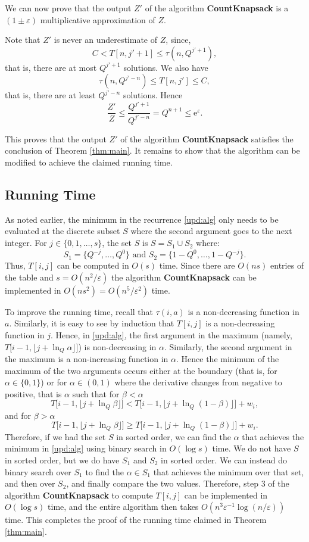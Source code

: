 \documentclass[11pt]{article}
\def\eps{\varepsilon}
\begin{document}
We can now prove that the output $Z'$ of the
algorithm {\bf CountKnapsack} is a
$(1\pm\eps)$ multiplicative
approximation of $Z$.

Note that $Z'$ is never an underestimate of $Z$, since,
\[
C < T[n,j'+1]\leq\tau(n,Q^{j'+1}),
\]
that is, there are at most $Q^{j'+1}$ solutions. We also have
\[
\tau(n,Q^{j'-n})\leq T[n,j']\leq C,
\] that is, there are at least $Q^{j'-n}$ solutions.
Hence
$$
\frac{Z'}{Z} \leq \frac{Q^{j'+1}}{Q^{j'-n}} = Q^{n+1}\leq {\mathrm e}^{\eps}.
$$

This proves that the output $Z'$ of the algorithm {\bf CountKnapsack}
satisfies the conclusion of Theorem \ref{thm:main}.
It remains to show that the algorithm can be modified to achieve the
claimed running time.

\subsection{Running Time}

As noted earlier, the minimum in the
recurrence \eqref{upd:alg} only needs to be evaluated at the discrete subset $S$
where the second argument goes to the next integer.
For $j\in \{0,1,\dots,s\}$,
the set $S$ is $S=S_1\cup S_2$ where:
\[
S_1 = \{Q^{-j},\dots,Q^{0}\} \mbox{ and }
S_2 = \{1-Q^0,\dots,1-Q^{-j}\}.
\]
Thus, $T[i,j]$ can be computed in $O(s)$ time.  Since
there are $O(ns)$ entries of the table and $s=O(n^2/\eps)$ the
algorithm {\bf CountKnapsack} can be implemented in $O(ns^2) = O(n^5/\eps^2)$ time.

To improve the running time, recall that $\tau(i,a)$ is a non-decreasing function in $a$.
Similarly, it is easy to see by induction that $T[i,j]$ is a non-decreasing
function in $j$.  Hence, in \eqref{upd:alg}, the first argument in the
maximum (namely, $T\big[i-1,\lfloor j + \ln_{Q}\alpha\rfloor\big]$)
is non-decreasing in $\alpha$.
Similarly, the second argument in the maximum is a non-increasing function in $\alpha$.
Hence
the minimum of the maximum of the two arguments occurs either at
the boundary (that is, for $\alpha\in\{0,1\}$) or for $\alpha\in
(0,1)$ where the derivative changes from negative to positive,
that is $\alpha$ such that for $\beta<\alpha$
$$T\big[i-1,\lfloor j + \ln_{Q}\beta\rfloor\big] < T\big[i-1,\lfloor j + \ln_{Q}(1-\beta)\rfloor\big] + w_i,$$
and for $\beta>\alpha$
$$T\big[i-1,\lfloor j + \ln_{Q}\beta\rfloor\big]\geq T\big[i-1,\lfloor j + \ln_{Q}(1-\beta)\rfloor\big] + w_i.$$
Therefore, if we had the set $S$ in sorted order, we can find the
$\alpha$ that achieves the minimum in \eqref{upd:alg} using binary
search in $O(\log{s})$ time.  We do not have $S$ in sorted order,
but we do have $S_1$ and $S_2$ in sorted order. We can instead do
binary search over $S_1$ to find the $\alpha\in S_1$ that achieves
the minimum over that set, and then over $S_2$, and finally
compare the two values. Therefore, step 3 of the algorithm {\bf
CountKnapsack} to compute $T[i,j]$ can be implemented in
$O(\log{s})$ time, and the entire algorithm then takes
$O(n^3\eps^{-1}\log(n/\eps))$ time. This completes the proof of
the running time claimed in Theorem \ref{thm:main}.
\end{document}
